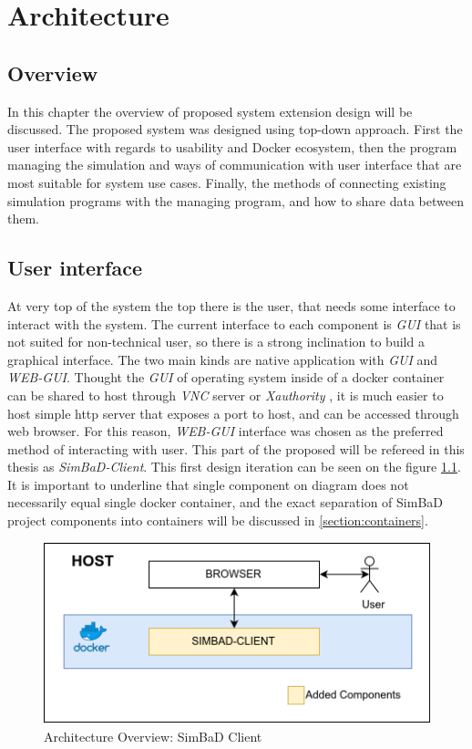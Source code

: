 \chapter{Architecture}
\label{chapter:3}
\section{Overview}
In this chapter the overview of proposed system extension design will be discussed.
The proposed system was designed using top-down approach. First the user interface with regards to usability and Docker ecosystem, then the program managing the simulation and ways of communication with user interface that are most suitable for system use cases. Finally, the methods of connecting existing simulation programs with the managing program, and how to share data between them.
\section{User interface}
At very top of the system the top there is the user, that needs some interface to interact with the system. The current interface to each component is \textit{GUI} that is not suited for non-technical user, so there is a strong inclination to build a graphical interface. The two main kinds are native application with \textit{GUI} and \textit{WEB-GUI}. Thought the \textit{GUI} of operating system inside of a docker container can be shared to host through \textit{VNC} server or \textit{Xauthority} \cite{DockerGUI}, it is much easier to host simple http server that exposes a port to host, and can be accessed through web browser. For this reason, \textit{WEB-GUI} interface was chosen as the preferred method of interacting with user. This part of the proposed will be refereed in this thesis as \textit{SimBaD-Client}. This first design iteration can be seen on the figure \ref{fig:arch0}. It is important to underline that single component on diagram does not necessarily equal single docker container, and the exact separation of SimBaD project components into containers will be discussed in \ref{section:containers}.
\begin{figure}[h!]
	\centering
		\includegraphics[width=0.9\linewidth]{diagrams/arch1.png}
	\caption{Architecture Overview: SimBaD Client}
	\label{fig:arch0}
\end{figure}
